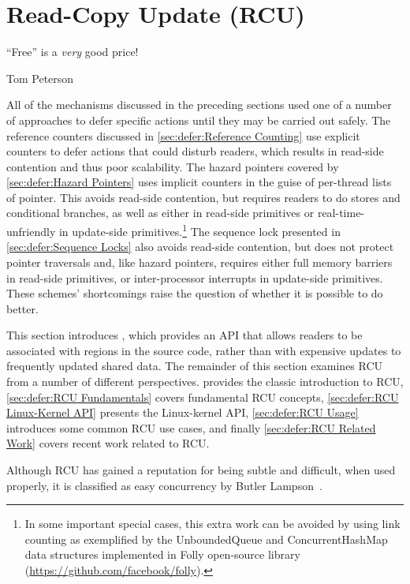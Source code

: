 
\section{Read-Copy Update (RCU)}
\label{sec:defer:Read-Copy Update (RCU)}
%
\epigraph{``Free'' is a \emph{very} good price!}{Tom Peterson}

All of the mechanisms discussed in the preceding sections
used one of a number of approaches to defer specific actions
until they may be carried out safely.
The reference counters discussed in
\cref{sec:defer:Reference Counting}
use explicit counters to defer actions that could disturb readers,
which results in read-side contention and thus poor scalability.
The hazard pointers covered by
\cref{sec:defer:Hazard Pointers}
uses implicit counters in the guise of per-thread lists of pointer.
This avoids read-side contention, but requires readers to do stores and
conditional branches, as well as either 
in read-side primitives or real-time-unfriendly  in
update-side primitives.\footnote{
	In some important special cases, this extra work can be avoided
	by using link counting as exemplified by the UnboundedQueue
	and ConcurrentHashMap data structures implemented in Folly
	open-source library
	(\url{https://github.com/facebook/folly}).}
The sequence lock presented in
\cref{sec:defer:Sequence Locks}
also avoids read-side contention, but does not protect pointer
traversals and, like hazard pointers, requires either full memory barriers
in read-side primitives, or inter-processor interrupts in update-side
primitives.
These schemes' shortcomings raise the question of
whether it is possible to do better.

This section introduces , which provides
an API that allows readers to be associated with regions in the source code,
rather than with expensive updates to frequently updated shared data.
The remainder of this
section examines RCU from a number of different perspectives.
 provides the classic
introduction to RCU,
\cref{sec:defer:RCU Fundamentals} covers fundamental RCU
concepts,
\cref{sec:defer:RCU Linux-Kernel API} presents the Linux-kernel
API,
\cref{sec:defer:RCU Usage} introduces some common RCU use cases,
and finally
\cref{sec:defer:RCU Related Work} covers recent work related
to RCU.

Although RCU has gained a reputation for being subtle and difficult,
when used properly, it is classified as easy concurrency by Butler
Lampson~\cite[Chapter 3]{Apt-Hoare2022Dijkstra}.






